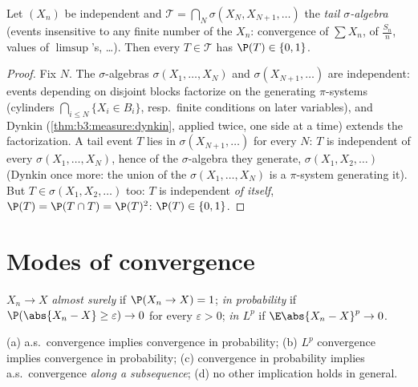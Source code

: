 \begin{theorem}
\label{thm:b3:probability:zeroone}
Let $(X_n)$ be independent and $\mathcal T =
\bigcap_N\sigma(X_N, X_{N+1}, \dots)$ the \emph{tail
$\sigma$-algebra} (events
insensitive to any finite number of the $X_n$: convergence of
$\sum X_n$, of $\frac{S_n}n$, values of $\limsup$'s, \dots).
Then every $T \in \mathcal T$ has $\P(T) \in \{0,
1\}$.
\end{theorem}

\begin{proof}
Fix $N$. The $\sigma$-algebras $\sigma(X_1, \dots, X_N)$ and
$\sigma(X_{N+1}, \dots)$ are independent: events depending on
disjoint blocks factorize on the generating $\pi$-systems
(cylinders $\bigcap_{i\leq N}\{X_i \in B_i\}$, resp.\ finite
conditions on later variables), and Dynkin
(\cref{thm:b3:measure:dynkin}, applied twice, one side at a
time) extends the factorization. A tail event $T$ lies in
$\sigma(X_{N+1}, \dots)$ for every $N$: $T$ is independent of
every $\sigma(X_1, \dots, X_N)$, hence of the $\sigma$-algebra
they generate, $\sigma(X_1, X_2, \dots)$ (Dynkin once more:
the union of the $\sigma(X_1,\dots,X_N)$ is a $\pi$-system
generating it). But $T \in \sigma(X_1, X_2, \dots)$ too: $T$
is independent \emph{of itself}, $\P(T) = \P(T\cap T) =
\P(T)^2$: $\P(T) \in \{0, 1\}$.
\end{proof}

\section{Modes of convergence}

\begin{definition}\label{def:b3:probability:modes}
$X_n \to X$ \emph{almost surely} if $\P(X_n \to X) = 1$;
\emph{in probability} if $\P(\abs{X_n - X} \geq \varepsilon)
\to 0$ for every $\varepsilon > 0$; \emph{in $L^p$} if
$\E\abs{X_n - X}^p \to 0$.
\end{definition}

\begin{proposition}\label{prop:b3:probability:modes}
(a) a.s.\ convergence implies convergence in probability;
(b) $L^p$ convergence implies convergence in probability;
(c) convergence in probability implies a.s.\ convergence
\emph{along a subsequence};
(d) no other implication holds in general.
\end{proposition}

